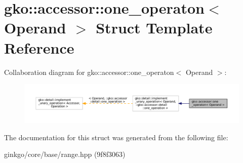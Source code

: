 \hypertarget{structgko_1_1accessor_1_1one__operaton}{}\section{gko\+:\+:accessor\+:\+:one\+\_\+operaton$<$ Operand $>$ Struct Template Reference}
\label{structgko_1_1accessor_1_1one__operaton}


Collaboration diagram for gko\+:\+:accessor\+:\+:one\+\_\+operaton$<$ Operand $>$\+:
\nopagebreak
\begin{figure}[H]
\begin{center}
\leavevmode
\includegraphics[width=350pt]{structgko_1_1accessor_1_1one__operaton__coll__graph}
\end{center}
\end{figure}


The documentation for this struct was generated from the following file\+:\begin{DoxyCompactItemize}
\item 
ginkgo/core/base/range.\+hpp (9f8f3063)\end{DoxyCompactItemize}
